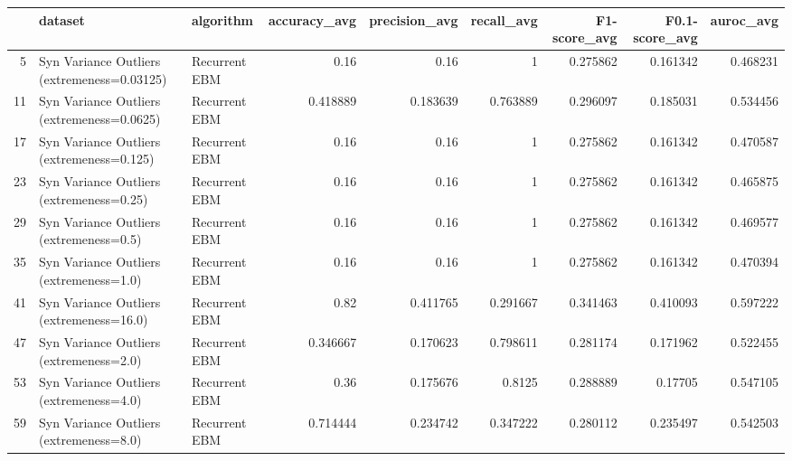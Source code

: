 \begin{tabular}{rllrrrrrr}
\hline
    & dataset                                     & algorithm     &   accuracy\_avg &   precision\_avg &   recall\_avg &   F1-score\_avg &   F0.1-score\_avg &   auroc\_avg \\
\hline
  5 & Syn Variance Outliers (extremeness=0.03125) & Recurrent EBM &       0.16     &        0.16     &     1        &       0.275862 &         0.161342 &    0.468231 \\
 11 & Syn Variance Outliers (extremeness=0.0625)  & Recurrent EBM &       0.418889 &        0.183639 &     0.763889 &       0.296097 &         0.185031 &    0.534456 \\
 17 & Syn Variance Outliers (extremeness=0.125)   & Recurrent EBM &       0.16     &        0.16     &     1        &       0.275862 &         0.161342 &    0.470587 \\
 23 & Syn Variance Outliers (extremeness=0.25)    & Recurrent EBM &       0.16     &        0.16     &     1        &       0.275862 &         0.161342 &    0.465875 \\
 29 & Syn Variance Outliers (extremeness=0.5)     & Recurrent EBM &       0.16     &        0.16     &     1        &       0.275862 &         0.161342 &    0.469577 \\
 35 & Syn Variance Outliers (extremeness=1.0)     & Recurrent EBM &       0.16     &        0.16     &     1        &       0.275862 &         0.161342 &    0.470394 \\
 41 & Syn Variance Outliers (extremeness=16.0)    & Recurrent EBM &       0.82     &        0.411765 &     0.291667 &       0.341463 &         0.410093 &    0.597222 \\
 47 & Syn Variance Outliers (extremeness=2.0)     & Recurrent EBM &       0.346667 &        0.170623 &     0.798611 &       0.281174 &         0.171962 &    0.522455 \\
 53 & Syn Variance Outliers (extremeness=4.0)     & Recurrent EBM &       0.36     &        0.175676 &     0.8125   &       0.288889 &         0.17705  &    0.547105 \\
 59 & Syn Variance Outliers (extremeness=8.0)     & Recurrent EBM &       0.714444 &        0.234742 &     0.347222 &       0.280112 &         0.235497 &    0.542503 \\
\hline
\end{tabular}


